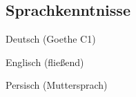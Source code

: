 \documentclass[../main.tex]{subfiles}
\begin{document}
\begin{category}
\section{Sprachkenntnisse}
    \begin{enumerate*}[label=$\diamond$]
        \item Deutsch (Goethe C1) \qquad \qquad \qquad
        \item Englisch (fließend) \qquad \qquad \qquad
        \item Persisch (Muttersprach) \qquad \qquad \qquad
    \end{enumerate*}
\end{category}
\end{document}
